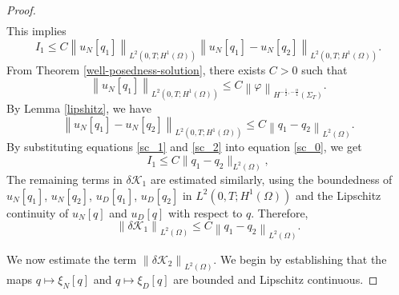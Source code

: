 \documentclass[a4paper,12pt,reqno,natbib]{amsart}
\begin{document}
{\begin{proof}
\begin{align*}
\end{align*}
This implies
\begin{equation}\label{sc_0}
I_1 \leq C\left\| u_N[q_1] \right\|_{L^2(0,T; H^1(\Omega))} \left\| u_N[q_1] - u_N[q_2] \right\|_{L^2(0,T; H^1(\Omega))}.
\end{equation}
From Theorem \ref{well-posedness-solution}, there exists \(C > 0\) such that
\begin{equation}
    \label{sc_1}
\left\| u_N[q_1] \right\|_{L^2(0,T; H^1(\Omega))} \leq C \left\| \varphi \right\|_{H^{-\frac{1}{2}, -\frac{\alpha}{4}}(\Sigma_T)}.
\end{equation}
By Lemma \ref{lipshitz}, we have
\begin{equation}
    \label{sc_2}
\left\| u_N[q_1] - u_N[q_2] \right\|_{L^2(0,T; H^1(\Omega))} \leq C \left\| q_1 - q_2 \right\|_{L^2(\Omega)}.
\end{equation}
By substituting equations \eqref{sc_1} and \eqref{sc_2} into equation \eqref{sc_0}, we get
\begin{equation} \label{sa_0}
    I_1 \leq  C \| q_1-q_2 \|_{L^2(\Omega)},
\end{equation}
The remaining terms in \(\delta \mathcal{K}_1\) are estimated similarly, using the boundedness of \(u_N[q_1]\),  \(u_N[q_2]\), \(u_D[q_1]\), \(u_D[q_2]\) in \(L^2(0,T; H^1(\Omega))\) and the Lipschitz continuity of \(u_N[q]\) and \(u_D[q]\) with respect to \(q\). Therefore,
\begin{equation}
    \label{delta_k_1}
\left\| \delta \mathcal{K}_1 \right\|_{L^2(\Omega)} \leq C \left\| q_1 - q_2 \right\|_{L^2(\Omega)}.
\end{equation}

We now estimate the term \(\left\| \delta \mathcal{K}_2 \right\|_{L^2(\Omega)}\). We begin by establishing that the maps \(q \mapsto \xi_N[q]\) and \(q \mapsto \xi_D[q]\) are bounded and Lipschitz continuous.


\end{proof}}
\end{document}
